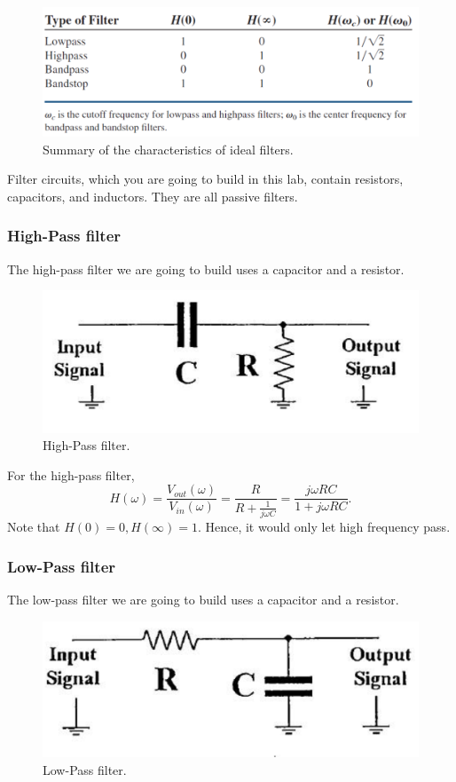 \documentclass{article}
\begin{document}
\begin{figure}[H]\centering
    \includegraphics[scale=0.7]{summary.png}
    \caption{Summary of the characteristics of ideal filters.}
\end{figure}

Filter circuits, which you are going to build in this lab, contain resistors, capacitors, and inductors. They are all passive filters.

\subsubsection{High-Pass filter}
The high-pass filter we are going to build uses a capacitor and a resistor.
\begin{figure}[H]\centering
    \includegraphics[scale=0.6]{highpass.png}
    \caption{High-Pass filter.}
\end{figure}

For the high-pass filter,
$$H(\omega) = \frac{V_{out}(\omega)}{V_{in}(\omega)} = \frac{R}{R+\frac{1}{j\omega C}} = \frac{j\omega RC}{1+j\omega RC}.$$
Note that $H(0) = 0, H(\infty) = 1$. Hence, it would only let high frequency pass.

\subsubsection{Low-Pass filter}
The low-pass filter we are going to build uses a capacitor and a resistor.
\begin{figure}[H]\centering
    \includegraphics[scale=0.6]{lowpass.png}
    \caption{Low-Pass filter.}
\end{figure}
\end{document}
